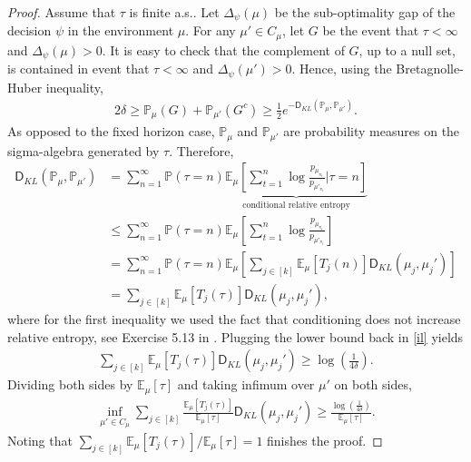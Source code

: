 \documentclass[letterpaper,11pt,openright,openany]{book}
\numberwithin{equation}{section}
\theoremstyle{plain}
\theoremstyle{definition}
\def\E{{\mathbb E}}
\def\P{{\mathbb P}}
\begin{document}
\begin{proof}
Assume that $\tau$ is finite a.s..  Let $\Delta_\psi(\mu)$ be the sub-optimality gap of the decision $\psi$ in the environment $\mu$. For any $\mu'\in C_\mu$, let $G$ be the event that $\tau<\infty$ and $\Delta_\psi(\mu)>0$. It is easy to check that the complement of $G$, up to a null set, is contained in event that $\tau<\infty$ and $\Delta_\psi(\mu')>0$. Hence, using the Bretagnolle-Huber inequality,
\begin{align}
2\delta\geq\P_\mu\left(G\right)+\P_{\mu'}\left(G^c\right)\geq\frac{1}{2}e^{-\mathsf D_{KL}(\P_\mu, \P_{\mu'})}.\label{il}
\end{align}
As opposed to the fixed horizon case, $\P_{\mu}$ and $\P_{\mu'}$ are probability measures on the sigma-algebra generated by $\tau$. Therefore, 
\begin{align*}
\mathsf D_{KL}(\P_\mu, \P_{\mu'}) &= \sum_{n=1}^\infty\P\left(\tau = n\right)\underbrace{\E_{\mu}\left[\sum_{t=1}^n\log\frac{p_{\mu_{\pi_t}}}{p_{\mu'_{\pi_t}}}\bigg |\tau = n\right]}_{\text{conditional relative entropy}}\\
&\leq\sum_{n=1}^\infty\P\left(\tau = n\right)\E_{\mu}\left[\sum_{t=1}^n\log\frac{p_{\mu_{\pi_t}}}{p_{\mu'_{\pi_t}}}\right]\\
& = \sum_{n=1}^\infty\P\left(\tau = n\right)\E_{\mu}\left[\sum_{j\in [k]}\E_{\mu}[T_j(n)]\mathsf D_{KL}(\mu_j, \mu_j')\right]\\
&= \sum_{j\in [k]}\E_{\mu}[T_j(\tau)]\mathsf D_{KL}(\mu_j, \mu_j'),
\end{align*}
where for the first inequality we used the fact that conditioning does not increase relative entropy, see Exercise 5.13 in \cite{Rassoul_Agha_2015}. Plugging the lower bound back in \eqref{il} yields
\begin{align*}
\sum_{j\in [k]}\E_{\mu}[T_j(\tau)]\mathsf D_{KL}(\mu_j, \mu_j')\geq\log\left(\frac{1}{4\delta}\right). 
\end{align*}
Dividing both sides by $\E_\mu[\tau]$ and taking infimum over $\mu'$ on both sides,  
\begin{align}
\inf_{\mu'\in C_\mu}\sum_{j\in [k]}\frac{\E_{\mu}[T_j(\tau)]}{\E_\mu[\tau]}\mathsf D_{KL}(\mu_j, \mu_j')\geq\frac{\log\left(\frac{1}{4\delta}\right)}{\E_\mu[\tau]}. \label{sp}
\end{align}
Noting that $\sum_{j\in [k]}\E_{\mu}[T_j(\tau)]/\E_\mu[\tau]=1$ finishes the proof. 
\end{proof}
\end{document}

